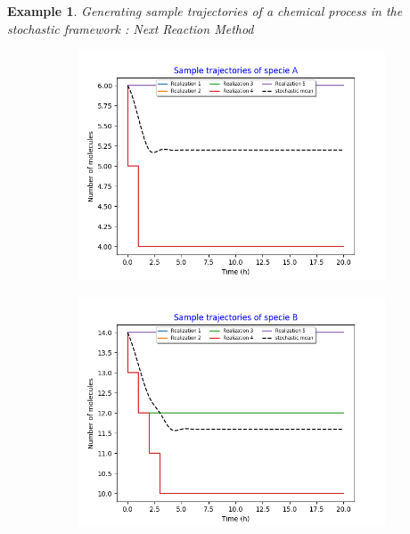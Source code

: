 \documentclass[11pt,a4paper]{article}
\newtheorem{example}[theorem]{Example}
\begin{document}
\begin{example}{Generating sample trajectories of a chemical process in the stochastic framework : Next Reaction Method}
    \begin{figure}[H]
    \centering
    \begin{subfigure}{.5\textwidth}
      \centering
        \includegraphics[width=1.1\linewidth]{Images/a.png}
        \label{fig: Single sample trajectory}
    \end{subfigure}%
    \begin{subfigure}{.5\textwidth}
      \centering
        \includegraphics[width=1.1\linewidth]{Images/b.png}
        \label{fig: Single sample trajectory}
    \end{subfigure}

\end{figure}
\end{example}
\end{document}
